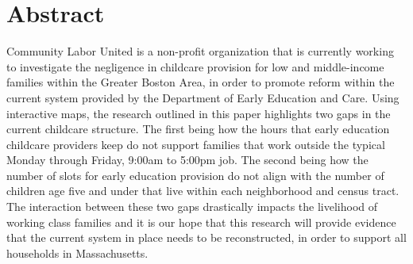 \documentclass[10pt,letterpaper]{article}
\newcommand{\getIndex}[2]{
  \ForEach{,}{\IfEq{#1}{\thislevelitem}{\number\thislevelcount\ExitForEach}{}}{#2}
}
\newcommand{\getAff}[1]{
  \getIndex{#1}{Smith College}
}
\begin{document}
\vspace*{0.2in}

\section*{Abstract}
Community Labor United is a non-profit organization that is currently
working to investigate the negligence in childcare provision for low and
middle-income families within the Greater Boston Area, in order to
promote reform within the current system provided by the Department of
Early Education and Care. Using interactive maps, the research outlined
in this paper highlights two gaps in the current childcare structure.
The first being how the hours that early education childcare providers
keep do not support families that work outside the typical Monday
through Friday, 9:00am to 5:00pm job. The second being how the number of
slots for early education provision do not align with the number of
children age five and under that live within each neighborhood and
census tract. The interaction between these two gaps drastically impacts
the livelihood of working class families and it is our hope that this
research will provide evidence that the current system in place needs to
be reconstructed, in order to support all households in Massachusetts.

\end{document}
